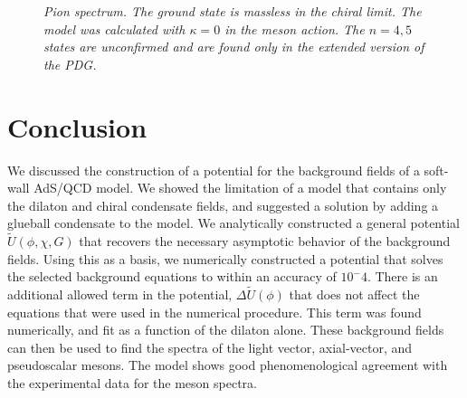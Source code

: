 \documentclass[12pt]{article}
\begin{document}
\begin{figure}[htb]
\caption{\textit{Pion spectrum. The ground state is massless in the chiral limit. The model was calculated with $\kappa=0$ in the meson action. The $n=4,5$ states are unconfirmed and are found only in the extended version of the PDG.}}
\end{figure}

\section{Conclusion}

We discussed the construction of a potential for the background fields of a soft-wall AdS/QCD model. 
We showed the limitation of a model that contains only the dilaton and chiral condensate fields, and suggested a solution by adding a glueball condensate to the model.
We analytically constructed a general potential $\tilde{U}(\phi,\chi,G)$ that recovers the necessary asymptotic behavior of the background fields.
Using this as a basis, we numerically constructed a potential that solves the selected background equations to within an accuracy of $10^-4$. 
There is an additional allowed term in the  potential, $\Delta \tilde{U}(\phi)$ that does not affect the equations that were used in the numerical procedure. 
This term was found numerically, and fit as a function of the dilaton alone.
These background fields can then be used to find the spectra of the light vector, axial-vector, and pseudoscalar mesons.
The model shows good phenomenological agreement with the experimental data for the meson spectra.
\end{document}
